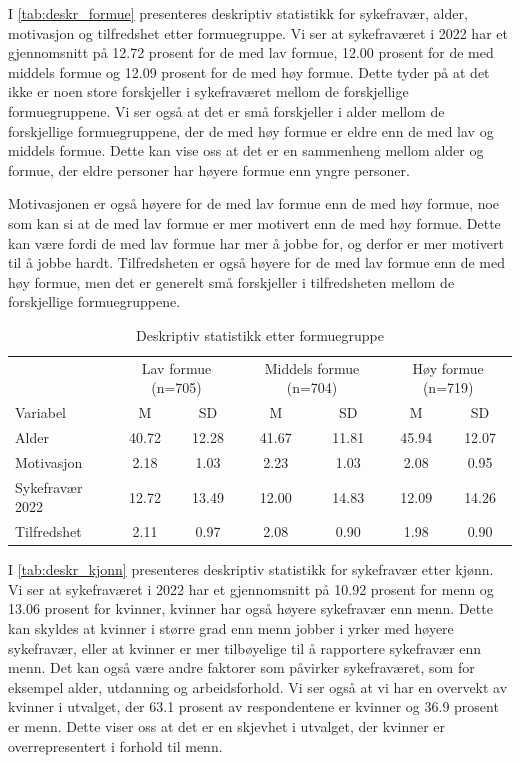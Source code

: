 \documentclass[
  12pt,
  a4paper,
  DIV=11,
  numbers=noendperiod]{scrartcl}
\begin{document}
I \autoref{tab:deskr_formue} presenteres deskriptiv statistikk for
sykefravær, alder, motivasjon og tilfredshet etter formuegruppe. Vi ser
at sykefraværet i 2022 har et gjennomsnitt på 12.72 prosent for de med
lav formue, 12.00 prosent for de med middels formue og 12.09 prosent for
de med høy formue. Dette tyder på at det ikke er noen store forskjeller
i sykefraværet mellom de forskjellige formuegruppene. Vi ser også at det
er små forskjeller i alder mellom de forskjellige formuegruppene, der de
med høy formue er eldre enn de med lav og middels formue. Dette kan vise
oss at det er en sammenheng mellom alder og formue, der eldre personer
har høyere formue enn yngre personer.

Motivasjonen er også høyere for de med lav formue enn de med høy formue,
noe som kan si at de med lav formue er mer motivert enn de med høy
formue. Dette kan være fordi de med lav formue har mer å jobbe for, og
derfor er mer motivert til å jobbe hardt. Tilfredsheten er også høyere
for de med lav formue enn de med høy formue, men det er generelt små
forskjeller i tilfredsheten mellom de forskjellige formuegruppene.

\begin{table}[ht]
\centering
\begin{tabular}{lcccccc}
\toprule
 & \multicolumn{2}{c}{Lav formue (n=705)} 
 & \multicolumn{2}{c}{Middels formue (n=704)} 
 & \multicolumn{2}{c}{Høy formue (n=719)} \\
\cmidrule(r){2-3}\cmidrule(lr){4-5}\cmidrule(l){6-7}
Variabel            & M     & SD    & M     & SD    & M     & SD    \\
\midrule
Alder               & 40.72 & 12.28 & 41.67 & 11.81 & 45.94 & 12.07 \\
Motivasjon          &  2.18 &  1.03 &  2.23 &  1.03 &  2.08 &  0.95 \\
Sykefravær 2022     & 12.72 & 13.49 & 12.00 & 14.83 & 12.09 & 14.26 \\
Tilfredshet         &  2.11 &  0.97 &  2.08 &  0.90 &  1.98 &  0.90 \\
\bottomrule
\end{tabular}
\caption{Deskriptiv statistikk etter formuegruppe}
\label{tab:deskr_formue}
\end{table}

I \autoref{tab:deskr_kjonn} presenteres deskriptiv statistikk for
sykefravær etter kjønn. Vi ser at sykefraværet i 2022 har et
gjennomsnitt på 10.92 prosent for menn og 13.06 prosent for kvinner,
kvinner har også høyere sykefravær enn menn. Dette kan skyldes at
kvinner i større grad enn menn jobber i yrker med høyere sykefravær,
eller at kvinner er mer tilbøyelige til å rapportere sykefravær enn
menn. Det kan også være andre faktorer som påvirker sykefraværet, som
for eksempel alder, utdanning og arbeidsforhold. Vi ser også at vi har
en overvekt av kvinner i utvalget, der 63.1 prosent av respondentene er
kvinner og 36.9 prosent er menn. Dette viser oss at det er en skjevhet i
utvalget, der kvinner er overrepresentert i forhold til menn.
\end{document}
